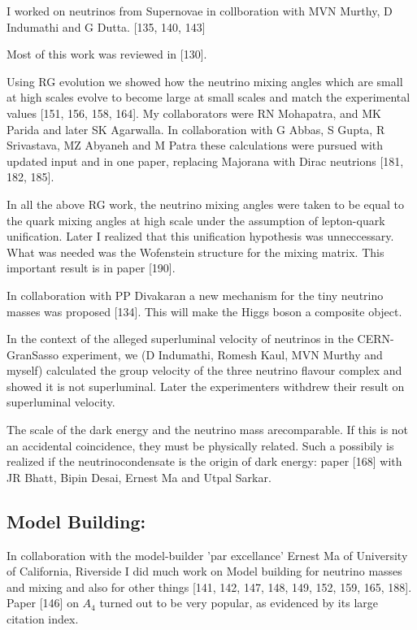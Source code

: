 I worked on neutrinos from Supernovae in collboration with MVN Murthy, D 
Indumathi and G Dutta. [135, 140, 143]

Most of this work was reviewed in [130].

Using RG evolution we showed how the neutrino mixing angles which are 
small at high scales evolve to become large at small scales and match 
the experimental values [151, 156, 158, 164]. My collaborators were RN 
Mohapatra, and MK Parida and later SK Agarwalla. In collaboration with G 
Abbas, S Gupta, R Srivastava, MZ Abyaneh and M Patra these calculations 
were pursued with updated input and in one paper, replacing Majorana with 
Dirac neutrions [181, 182, 185].

In all the above RG work, the neutrino mixing angles were taken to be 
equal to the quark mixing angles at high scale under the assumption of 
lepton-quark unification. Later I realized that this unification 
hypothesis was unneccessary. What was needed was the Wofenstein 
structure for the mixing matrix. This important result is in paper 
[190].

In collaboration with PP Divakaran a new mechanism for the tiny neutrino 
masses was proposed [134]. This will make the Higgs boson a composite 
object.

In the context of the alleged superluminal velocity of neutrinos in the 
CERN-GranSasso experiment, we (D Indumathi, Romesh Kaul, MVN Murthy and 
myself) calculated the group velocity of the three neutrino flavour 
complex and showed it is not super\-luminal. Later the experimenters 
withdrew their result on super\-luminal velocity.

The scale of the dark energy and the neutrino mass are\break comparable. If 
this is not an accidental coincidence, they must be physically related. 
Such a possibily is realized if the neutrino\break condensate is the origin of 
dark energy: paper [168] with JR Bhatt, Bipin Desai, Ernest Ma and Utpal 
Sarkar.

\subsection*{Model Building:}

In collaboration with the model-builder 'par excellance' Ernest Ma of 
University of California, Riverside I did much work on Model building 
for neutrino masses and mixing and also for other things 
[141, 142, 147, 148, 149, 152, 159, 165, 188]. Paper [146] on $A_4$ turned out to 
be very popular, as evidenced by its large citation index.


